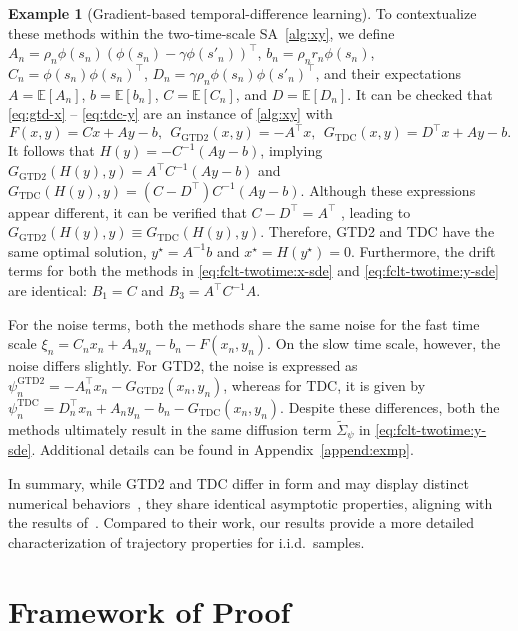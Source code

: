 \documentclass[11pt]{article}
\theoremstyle{plain}
\theoremstyle{definition}
\newtheorem{exam}{Example}[section]
\def\EB{{\mathbb E}}
\def\Ga{G_{\mathrm{GTD2}}}
\def\Gb{G_{\mathrm{TDC}}}
\def\psia{\psi^{\mathrm{GTD2}}}
\def\psib{\psi^{\mathrm{TDC}}}
\begin{document}
\begin{exam}[Gradient-based temporal-difference learning]
	To contextualize these methods within the two-time-scale SA~\eqref{alg:xy}, we define $A_n =  \rho_{n} \phi(s_n) ( \phi(s_n) - \gamma \phi(s'_n) )^\top $, $b_n = \rho_{n} r_{n} \phi(s_n) $, $C_n = \phi(s_{n}) \phi(s_n)^\top $, $D_n = \gamma \rho_{n} \phi(s_n) \phi(s'_n)^\top$, and their expectations $A= \EB[A_n]$, $b = \EB[b_n]$, $C=\EB[C_n]$, and $D=\EB[D_n]$.
	It can be checked that \eqref{eq:gtd-x} -- \eqref{eq:tdc-y} are an instance of \eqref{alg:xy} with
	\begin{equation*}
		F(x,y) = Cx +Ay-b,\ \ 
		\Ga(x,y) = -A^\top x,\ \ 
		\Gb (x,y) = D^\top x + Ay - b.
	\end{equation*}
	It follows that $H(y) = -C^{-1}(Ay-b)$, implying
	$\Ga(H(y), y) = A^\top C^{-1} (Ay- b)$ and $\Gb(H(y), y) = (C - D^\top) C^{-1} (Ay - b)$.
	Although these expressions appear different, it can be verified that $C - D^\top = A^\top$ \citep[Equation~(68)]{li2024high}, leading to $\Ga (H(y), y) \equiv \Gb(H(y),y)$. 
	Therefore, GTD2 and TDC have the same optimal solution, $y^\star = A^{-1} b$ and $x^\star = H(y^\star) = 0$. Furthermore, the drift terms for both the methods in \eqref{eq:fclt-twotime:x-sde} and \eqref{eq:fclt-twotime:y-sde} are identical: $B_1 = C$ and $B_3 = A^\top C^{-1} A$.
	
	For the noise terms, both the methods share the same noise for the fast time scale $\xi_{n} = C_n x_{n} + A_n y_n - b_n - F(x_n, y_n) $.
	On the slow time scale, however, the noise differs slightly. For GTD2, the noise is expressed as $\psia_{n} = - A_{n}^\top x_n - \Ga(x_n, y_n) $, whereas for TDC, it is given by $\psib_{n} = D_n^\top x_{n} + A_n y_n - b_n - \Gb(x_n, y_n)$.
	Despite these differences, both the methods ultimately result in the same diffusion term $\widetilde{\Sigma}_{\psi}$ in \eqref{eq:fclt-twotime:y-sde}. Additional details can be found in Appendix~\ref{append:exmp}.
	
	In summary, while GTD2 and TDC differ in form and may display distinct numerical behaviors~\citep{dann2014policy}, they share identical asymptotic properties, aligning with the results of~\citep{hu2024central}. Compared to their work, our results provide a more detailed characterization of trajectory properties for i.i.d.\ samples.
\end{exam}



\section{Framework of Proof}
\label{sec:fclt:proof-frame}
\end{document}
